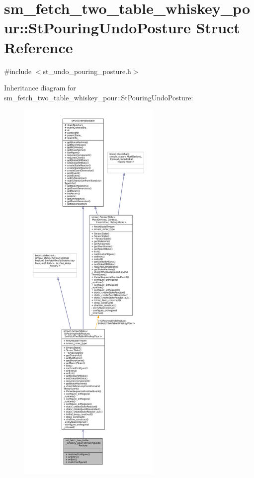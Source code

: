 \hypertarget{structsm__fetch__two__table__whiskey__pour_1_1StPouringUndoPosture}{}\section{sm\+\_\+fetch\+\_\+two\+\_\+table\+\_\+whiskey\+\_\+pour\+:\+:St\+Pouring\+Undo\+Posture Struct Reference}
\label{structsm__fetch__two__table__whiskey__pour_1_1StPouringUndoPosture}


{\ttfamily \#include $<$st\+\_\+undo\+\_\+pouring\+\_\+posture.\+h$>$}



Inheritance diagram for sm\+\_\+fetch\+\_\+two\+\_\+table\+\_\+whiskey\+\_\+pour\+:\+:St\+Pouring\+Undo\+Posture\+:
\nopagebreak
\begin{figure}[H]
\begin{center}
\leavevmode
\includegraphics[height=550pt]{structsm__fetch__two__table__whiskey__pour_1_1StPouringUndoPosture__inherit__graph}
\end{center}
\end{figure}


